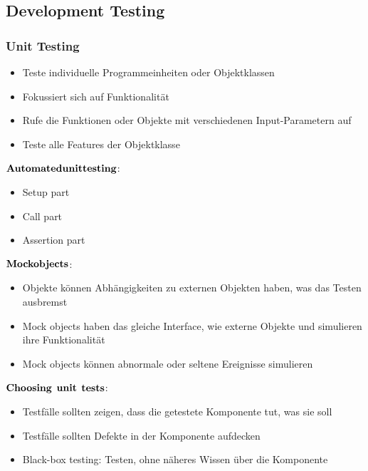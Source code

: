 \subsection{Development Testing}
\subsubsection{Unit Testing}
\begin{itemize}
	\item Teste individuelle Programmeinheiten oder Objektklassen
	\item Fokussiert sich auf Funktionalität
	\item Rufe die Funktionen oder Objekte mit verschiedenen Input-Parametern auf
	\item Teste alle Features der Objektklasse  
\end{itemize}
$\bold{Automated unit testing}$:
\begin{itemize}
	\item Setup part
	\item Call part
	\item Assertion part
\end{itemize}
$\bold{Mock objects}$:
\begin{itemize}
	\item Objekte können Abhängigkeiten zu externen Objekten haben, was das Testen ausbremst
	\item Mock objects haben das gleiche Interface, wie externe Objekte und simulieren ihre Funktionalität
	\item Mock objects können abnormale oder seltene Ereignisse simulieren
\end{itemize}
$\bold{Choosing}$ $\bold{unit}$ $\bold{tests}$:
\begin{itemize}
	\item Testfälle sollten zeigen, dass die getestete Komponente tut, was sie soll
	\item Testfälle sollten Defekte in der Komponente aufdecken
	\item Black-box testing: Testen, ohne näheres Wissen über die Komponente
\end{itemize}
